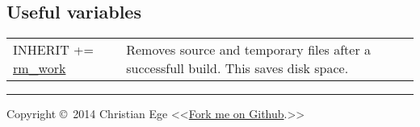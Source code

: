\documentclass[10pt,a4paper,landscape]{article}
\begin{document}
\begin{multicols}{2}
\section{Useful variables}
\begin{tabular}{p{5.5cm}p{\linewidth - 6.4cm}}
INHERIT += \href{http://git.yoctoproject.org/cgit.cgi/poky/tree/meta/classes/rm_work.bbclass?h=dora}{rm\_work} & Removes source and temporary files after a successfull build. This saves disk space.
\end{tabular}

\rule{\linewidth}{0.25pt}
\scriptsize

Copyright \copyright\ 2014 Christian Ege \textless\textless \href{http://cybertux.github.io/cheatsheets}{Fork me on Github}.\textgreater \textgreater

%

\end{multicols}
\end{document}
